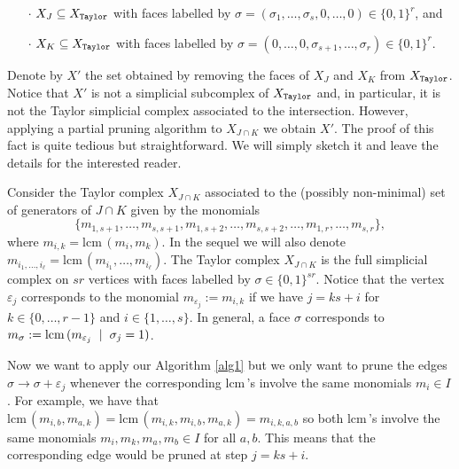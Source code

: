 \documentclass[12pt]{amsart}
\theoremstyle{definition}
\theoremstyle{remark}
\numberwithin{equation}{section}
\newcommand{\lcm}{\mathrm {lcm\, }}
\newcommand{\lra}{{\longrightarrow}}
\begin{document}
\begin{itemize}
 \item [$\cdot$] $X_J\subseteq X_{\tt Taylor}$  with faces labelled by
 $\sigma=(\sigma_1,\dots,\sigma_s,0,\dots,0) \in \{0,1\}^r$, and
 \item [$\cdot$] $X_K\subseteq X_{\tt Taylor}$  with faces labelled by
 $\sigma=(0,\dots,0,\sigma_{s+1},\dots,\sigma_r) \in \{0,1\}^r$.
\end{itemize}

\vskip 2mm

Denote by $X'$ the set obtained by removing the faces of
$X_J$ and $X_K$ from $X_{\tt Taylor}$. Notice that  $X'$
 is not a simplicial subcomplex of $X_{\tt Taylor}$ and, in particular,
 it is not the Taylor simplicial complex associated to the intersection.
 However, applying a partial pruning algorithm to $X_{J\cap K}$ we obtain  $X'$.
 The proof of this fact is quite tedious but straightforward.
 We will simply sketch it  and leave the details for the interested reader.


 \vskip 2mm

  Consider the Taylor complex  $X_{J\cap K}$
 associated to the (possibly non-minimal) set of generators of  $J\cap K$  given by
 the monomials
 $$\{ m_{1,s+1},\dots, m_{s,s+1},  m_{1,s+2}, \dots, m_{s,s+2},  \dots, m_{1,r}, \dots, m_{s,r}\},$$
 where $m_{i,k}=\lcm(m_i,m_k)$.  In the sequel we will also denote $m_{i_1,\dots, i_\ell}=\lcm(m_{i_1},\dots, m_{i_\ell})$.
The Taylor complex $X_{J\cap K}$ is the full simplicial complex on $sr$ vertices with faces labelled by
$\sigma \in \{0,1\}^{sr}$. Notice that the  vertex $\varepsilon_{j}$  corresponds to the monomial
$m_{\varepsilon_j}:=m_{i,k}$ if we have
$j=ks+i$ for $k\in \{0,\dots, r-1\}$ and $i\in\{1,\dots, s\}$.  In general, a face $\sigma$ corresponds
to $m_\sigma:=\lcm (m_{\varepsilon_j} \hskip 2mm | \hskip 2mm \sigma_j = 1)$.


 \vskip 2mm

 Now we want to apply our Algorithm \ref{alg1} but we only want to prune the edges
 ${\sigma} \lra{\sigma + \varepsilon_j}$ whenever the corresponding $\lcm$'s involve the same
 monomials $m_i \in I$. For example, we have  that
 $\lcm(m_{i,b}, m_{a,k})=\lcm(m_{i,k},m_{i,b}, m_{a,k})=m_{i,k,a,b}$  so both $\lcm$'s
 involve the same monomials $m_i,m_k,m_a,m_b \in I$ for all $a,b$.
 This means that the corresponding edge would be pruned at step $j=ks+i$.
\end{document}
